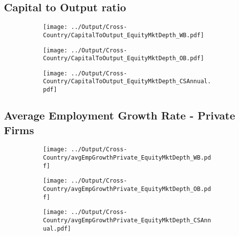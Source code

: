 \documentclass[12pt,notitlepage]{article}
\begin{document}
\subsection{Capital to Output ratio}
\begin{figure}[!htpb]
\centering
\begin{subfigure}{.49\textwidth}
    \centering
 \texttt{[image: ../Output/Cross-Country/CapitalToOutput\_EquityMktDepth\_WB.pdf]}
\end{subfigure}
\begin{subfigure}{.49\textwidth}
    \centering
  \texttt{[image: ../Output/Cross-Country/CapitalToOutput\_EquityMktDepth\_OB.pdf]}
\end{subfigure}
\begin{subfigure}{.49\textwidth}
    \centering
  \texttt{[image: ../Output/Cross-Country/CapitalToOutput\_EquityMktDepth\_CSAnnual.pdf]}
\end{subfigure}
\end{figure}
\pagebreak

\subsection{Average Employment Growth Rate - Private Firms}
\begin{figure}[!htpb]
\centering
\begin{subfigure}{.49\textwidth}
    \centering
 \texttt{[image: ../Output/Cross-Country/avgEmpGrowthPrivate\_EquityMktDepth\_WB.pdf]}
\end{subfigure}
\begin{subfigure}{.49\textwidth}
    \centering
  \texttt{[image: ../Output/Cross-Country/avgEmpGrowthPrivate\_EquityMktDepth\_OB.pdf]}
\end{subfigure}
\begin{subfigure}{.49\textwidth}
    \centering
  \texttt{[image: ../Output/Cross-Country/avgEmpGrowthPrivate\_EquityMktDepth\_CSAnnual.pdf]}
\end{subfigure}
\end{figure}
\pagebreak
\end{document}

